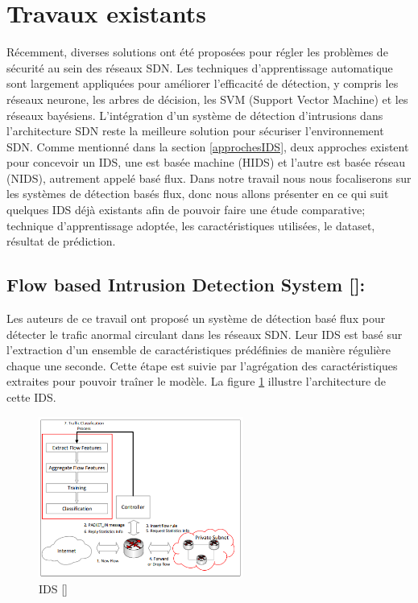 \section{Travaux existants}
Récemment, diverses solutions ont été proposées pour régler les problèmes de sécurité au sein des réseaux SDN. Les techniques d’apprentissage automatique sont largement appliquées pour améliorer l’efficacité de détection, y compris les réseaux neurone, les arbres de décision, les SVM (Support Vector Machine) et les réseaux bayésiens. L'intégration d'un système de détection d'intrusions dans l'architecture SDN reste la meilleure solution pour sécuriser l'environnement SDN. Comme mentionné dans la section \ref{approchesIDS}, deux approches existent pour concevoir un IDS, une est basée machine (HIDS) et l'autre est basée réseau (NIDS), autrement appelé basé flux. Dans notre travail nous nous focaliserons sur les systèmes de détection basés flux, donc nous allons présenter en ce qui suit quelques IDS déjà existants afin de pouvoir faire une étude comparative; technique d'apprentissage adoptée, les caractéristiques utilisées, le dataset, résultat de prédiction.\\

\newpage
\subsection{Flow based Intrusion Detection System [\cite{11}]:}
Les auteurs de ce travail ont proposé un système de détection basé flux pour détecter le trafic anormal circulant dans les réseaux SDN. Leur IDS est basé sur l’extraction d’un ensemble de caractéristiques prédéfinies de manière régulière chaque une seconde. Cette étape est suivie par l’agrégation des caractéristiques extraites pour pouvoir traîner le modèle. La figure \ref{fig:NIDS1} illustre l'architecture de cette IDS.
\begin{figure}[h]
\centering
\includegraphics[width=0.6\textwidth]{Figures/NIDS1}
\decoRule
\caption{IDS [\cite{11}]}
\label{fig:NIDS1}
\end{figure}

